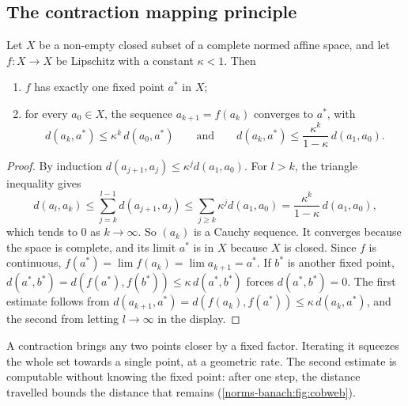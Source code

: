 \begin{notechapter}
\section{The contraction mapping principle}
\label{norms-banach:sec:contraction}

\begin{theorem}
\label{norms-banach:thm:contraction}
Let $X$ be a non-empty closed subset of a complete normed affine space, and
let $f:X\to X$ be Lipschitz with a constant $\kappa < 1$. Then
\begin{enumerate}[nosep]
  \item $f$ has exactly one fixed point $a^*$ in $X$;
  \item for every $a_0\in X$, the sequence $a_{k+1} = f(a_k)$ converges to
        $a^*$, with
        \[
          d(a_k, a^*)\leq\kappa^k\,d(a_0, a^*)
          \qquad\text{and}\qquad
          d(a_k, a^*)\leq\frac{\kappa^k}{1 - \kappa}\,d(a_1, a_0) .
        \]
\end{enumerate}
\end{theorem}

\begin{proof}
By induction $d(a_{j+1}, a_j)\leq\kappa^jd(a_1, a_0)$. For $l > k$, the
triangle inequality gives
\[
  d(a_l, a_k)\leq\sum_{j=k}^{l-1}d(a_{j+1}, a_j)
  \leq\sum_{j\geq k}\kappa^jd(a_1, a_0)
  = \frac{\kappa^k}{1 - \kappa}\,d(a_1, a_0) ,
\]
which tends to $0$ as $k\to\infty$. So $(a_k)$ is a Cauchy sequence. It
converges because the space is complete, and its limit $a^*$ is in $X$
because $X$ is closed. Since $f$ is continuous,
$f(a^*) = \lim f(a_k) = \lim a_{k+1} = a^*$. If $b^*$ is another fixed
point, $d(a^*, b^*) = d(f(a^*), f(b^*))\leq\kappa\,d(a^*, b^*)$ forces
$d(a^*, b^*) = 0$. The first estimate follows from
$d(a_{k+1}, a^*) = d(f(a_k), f(a^*))\leq\kappa\,d(a_k, a^*)$, and the
second from letting $l\to\infty$ in the display.
\end{proof}

\begin{intuition}
A contraction brings any two points closer by a fixed factor. Iterating it
squeezes the whole set towards a single point, at a geometric rate. The
second estimate is computable without knowing the fixed point: after one
step, the distance travelled bounds the distance that remains
(\cref{norms-banach:fig:cobweb}).
\end{intuition}


\end{notechapter}
